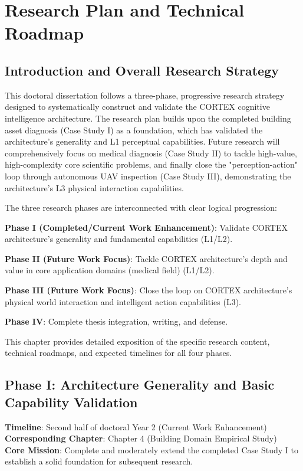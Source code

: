 
\chapter{Research Plan and Technical Roadmap} \label{app:research-plan}

\section{Introduction and Overall Research Strategy}

This doctoral dissertation follows a three-phase, progressive research strategy designed to systematically construct and validate the CORTEX cognitive intelligence architecture. The research plan builds upon the completed building asset diagnosis (Case Study I) as a foundation, which has validated the architecture's generality and L1 perceptual capabilities. Future research will comprehensively focus on medical diagnosis (Case Study II) to tackle high-value, high-complexity core scientific problems, and finally close the "perception-action" loop through autonomous UAV inspection (Case Study III), demonstrating the architecture's L3 physical interaction capabilities.

The three research phases are interconnected with clear logical progression:

\textbf{Phase I (Completed/Current Work Enhancement)}: Validate CORTEX architecture's generality and fundamental capabilities (L1/L2).

\textbf{Phase II (Future Work Focus)}: Tackle CORTEX architecture's depth and value in core application domains (medical field) (L1/L2).

\textbf{Phase III (Future Work Focus)}: Close the loop on CORTEX architecture's physical world interaction and intelligent action capabilities (L3).

\textbf{Phase IV}: Complete thesis integration, writing, and defense.

This chapter provides detailed exposition of the specific research content, technical roadmaps, and expected timelines for all four phases.

\section{Phase I: Architecture Generality and Basic Capability Validation}

\textbf{Timeline}: Second half of doctoral Year 2 (Current Work Enhancement)\\
\textbf{Corresponding Chapter}: Chapter 4 (Building Domain Empirical Study)\\
\textbf{Core Mission}: Complete and moderately extend the completed Case Study I to establish a solid foundation for subsequent research.

